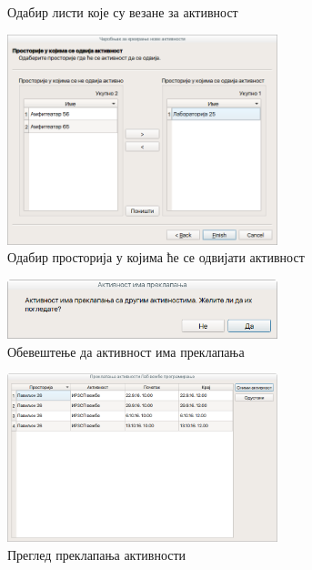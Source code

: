\documentclass[a4paper, 12pt, diplomski]{etfcyr}
\begin{document}
\begin{justify}
\begin{figure}[H]
\begin{center}
						\end{center}
						\caption{Одабир листи које су везане за активност}
						\label{figure:activity_lists}
					\end{figure}
					\begin{figure}[H]
						\begin{center}
							\includegraphics[width=0.70\textwidth]{manual/activity_wizard_rooms.png}
						\end{center}
						\caption{Одабир просторија у којима ће се одвијати активност}
						\label{figure:activity_rooms}
					\end{figure}
					\begin{figure}[H]
						\begin{center}
							\includegraphics[width=0.70\textwidth]{manual/overlap_warning.png}
						\end{center}
						\caption{Обевештење да активност има преклапања}
						\label{figure:overlap_warning}
					\end{figure}
					\begin{figure}[H]
						\begin{center}
							\includegraphics[width=0.70\textwidth]{manual/overlaps.png}
						\end{center}
						\caption{Преглед преклапања активности}
						\label{figure:overlaps}
					\end{figure}
				\end{justify}
\end{document}
